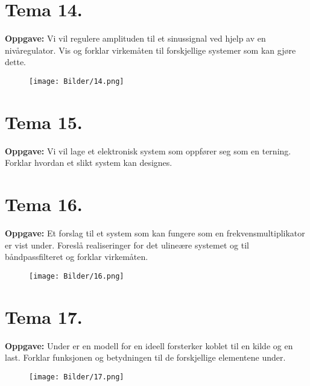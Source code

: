 \documentclass[a4paper,11pt,norsk]{article}
\begin{document}
\newpage
\section{Tema 14.}
\begin{question}
    \textbf{Oppgave:}
        Vi vil regulere amplituden til et sinussignal ved hjelp av en nivåregulator. Vis og
        forklar virkemåten til forskjellige systemer som kan gjøre dette.

        \begin{figure}[H]
            \centering 
            \texttt{[image: Bilder/14.png]}
        \end{figure}
\end{question}

\newpage
\section{Tema 15.}
\begin{question}
    \textbf{Oppgave:}
        Vi vil lage et elektronisk system som oppfører seg som en terning. Forklar hvordan
        et slikt system kan designes.
\end{question}

\newpage
\section{Tema 16.}
\begin{question}
    \textbf{Oppgave:}
        Et forslag til et system som kan fungere som en frekvensmultiplikator er vist under.
        Foreslå realiseringer for det ulineære systemet og til båndpassfilteret og forklar
        virkemåten.

        \begin{figure}[H]
            \centering 
            \texttt{[image: Bilder/16.png]}
        \end{figure}
\end{question}

\newpage
\section{Tema 17.}
\begin{question}
    \textbf{Oppgave:}
        Under er en modell for en ideell forsterker koblet til en kilde og en last. Forklar
        funksjonen og betydningen til de forskjellige elementene under.

        \begin{figure}[H]
            \centering 
            \texttt{[image: Bilder/17.png]}
        \end{figure}
\end{question}
\end{document}
